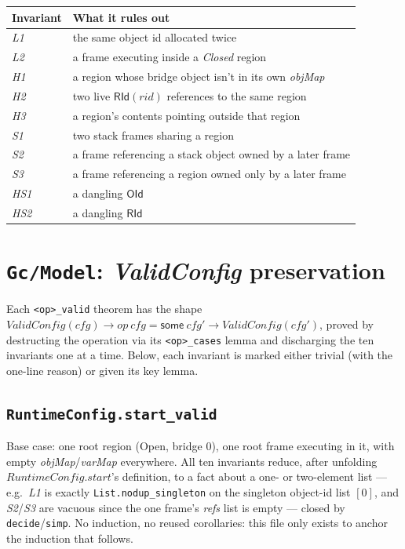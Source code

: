 \documentclass[11pt]{article}
\newcommand{\file}[1]{\texttt{#1}}
\newcommand{\op}[1]{\texttt{#1}}
\newcommand{\thm}[1]{\textbf{\texttt{#1}}}
\begin{document}
\begin{center}
\begin{tabular}{@{}ll@{}}
\toprule
Invariant & What it rules out \\
\midrule
\textit{L1} & the same object id allocated twice \\
\textit{L2} & a frame executing inside a \textit{Closed} region \\
\textit{H1} & a region whose bridge object isn't in its own \textit{objMap} \\
\textit{H2} & two live $\mathsf{RId}(rid)$ references to the same region \\
\textit{H3} & a region's contents pointing outside that region \\
\textit{S1} & two stack frames sharing a region \\
\textit{S2} & a frame referencing a stack object owned by a later frame \\
\textit{S3} & a frame referencing a region owned only by a later frame \\
\textit{HS1} & a dangling $\mathsf{OId}$ \\
\textit{HS2} & a dangling $\mathsf{RId}$ \\
\bottomrule
\end{tabular}
\end{center}

\section{\file{Gc/Model}: \textit{ValidConfig} preservation}

Each \op{<op>\_valid} theorem has the shape $\mathit{ValidConfig}(cfg) \to op\ cfg =
\mathsf{some}\ cfg' \to \mathit{ValidConfig}(cfg')$, proved by destructing the operation via its
\op{<op>\_cases} lemma and discharging the ten invariants one at a time. Below, each invariant is
marked either trivial (with the one-line reason) or given its key lemma.

\subsection{\thm{RuntimeConfig.start\_valid}}
Base case: one root region (Open, bridge $0$), one root frame executing in it, with empty
\textit{objMap}/\textit{varMap} everywhere. All ten invariants reduce, after unfolding
$RuntimeConfig.start$'s definition, to a fact about a one- or two-element list --- e.g.\
\textit{L1} is exactly \texttt{List.nodup\_singleton} on the singleton object-id list $[0]$, and
\textit{S2}/\textit{S3} are vacuous since the one frame's \textit{refs} list is empty --- closed by
\texttt{decide}/\texttt{simp}. No induction, no reused corollaries: this file only exists to anchor
the induction that follows.
\end{document}

